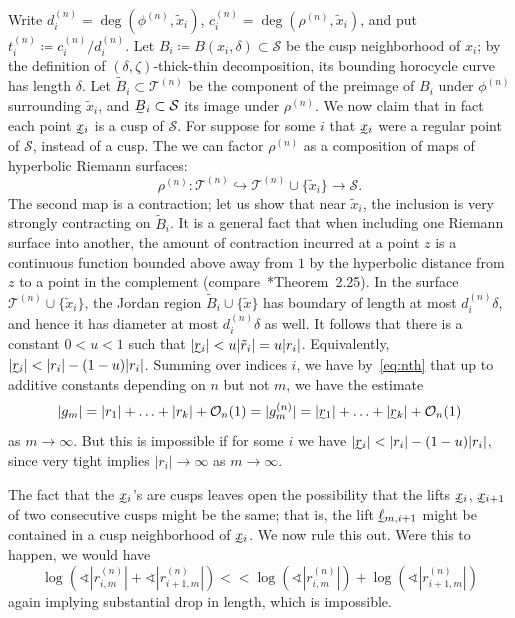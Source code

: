 \documentclass{amsart}
\theoremstyle{definition}
\theoremstyle{remark}
\newcommand{\cT}{\mathcal{T}}
\newcommand{\cS}{\mathcal{S}}
\renewcommand\ll{<\!\!<}
\begin{document}
Write $d^{(n)}_i=\deg(\phi^{(n)}, \tilde{x}_i)$, $c^{(n)}_i=\deg(\rho^{(n)}, \tilde{x}_i)$, and put $t^{(n)}_i\coloneqq c^{(n)}_i/d^{(n)}_i$.  Let $B_i\coloneqq B(x_i,\delta) \subset \cS$ be the cusp neighborhood of $x_i$;  by the definition of $(\delta, \zeta)$-thick-thin decomposition, its bounding horocycle curve has length $\delta$.  
Let $\tilde{B}_i \subset \cT^{(n)}$ be the component of the preimage of $B_i$ under $\phi^{(n)}$ surrounding $\tilde{x}_i$, and $\undertilde{B}_i \subset \cS$ its image under $\rho^{(n)}$.  We now claim that in fact each point $\undertilde{x}_i$ is a cusp of $\cS$.  For suppose for some $i$ that $\undertilde{x}_i$ were a regular point of $\cS$, instead of a cusp. The we can factor $\rho^{(n)}$ as a composition of maps of hyperbolic Riemann surfaces:
\[ \rho^{(n)}\colon \cT^{(n)} \hookrightarrow \cT^{(n)}\cup\{\tilde{x}_i\}\to\cS.\]
The second map is a   contraction; let us show that near $\tilde{x}_i$, the inclusion is very strongly contracting on $\tilde{B}_i$. It is a general fact that when including one Riemann surface into another, the amount of contraction incurred at a point $z$ is a continuous function bounded above away from $1$ by the hyperbolic distance from $z$ to a point in the complement (compare~\cite{ctm:renorm}*{Theorem~2.25}). In the surface $\cT^{(n)} \cup \{\tilde{x}_i\}$, the Jordan region $\tilde{B}_i \cup\{\tilde{x}\}$ has boundary of length at most $d_i^{(n)}\delta$, and hence it has diameter at most $d^{(n)}_i\delta$ as well. It follows that there is a constant $0<u<1$ such that $|\undertilde{r}_i| < u|\tilde{r}_i|=u|r_i|$.  Equivalently, $|\undertilde{r}_i| < |r_i| - (1-u)|r_i|$. Summing over indices $i$, we have by~\ref{eq:nth}  that up to additive constants depending on $n$ but not $m$, we have the estimate 
\[ |g_m|=|r_1|+\ldots+|r_k| + \mathcal O_n(1)  = |g_m^{(n)}|=|\undertilde{r}_1| + \ldots + |\undertilde{r}_k| + \mathcal O_n(1)\]
as $m\to\infty$. 
But this is impossible if for some $i$ we have $|\undertilde{r}_i| < |r_i|-(1-u)|r_i|$, since very tight implies $|r_i|\to\infty$ as $m\to\infty$. 

The fact that the $\undertilde{x}_i$'s are cusps leaves open the possibility that the lifts 
$\undertilde{x}_i$, $\undertilde{x}_{i+1}$ of two consecutive cusps might be the same; that is, the lift $\undertilde{\ell}_{m, i+1}$ might be contained in a cusp neighborhood of $\undertilde{x}_i$. We now rule this out. Were this to happen, we would have  
  \[ \log(\sphericalangle |r_{i,m}^{(n)}| + \sphericalangle |r^{(n)}_{i+1,m}|) \ll \log(\sphericalangle |r_{i,m}^{(n)}| )+ \log(\sphericalangle |r^{(n)}_{i+1,m}|) \]
again implying substantial drop in length, which is impossible. 
\end{document}
